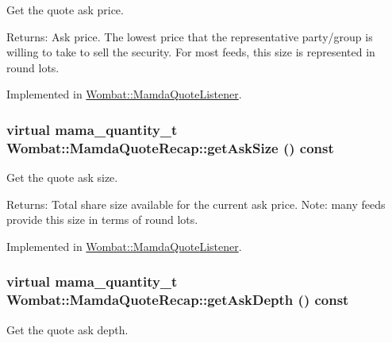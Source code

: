 Get the quote ask price. 

\begin{Desc}
\item[Returns:]Ask price. The lowest price that the representative party/group is willing to take to sell the security. For most feeds, this size is represented in round lots. \end{Desc}


Implemented in \hyperlink{classWombat_1_1MamdaQuoteListener_b4c49376d3d07db48065adc6d74da196}{Wombat::Mamda\-Quote\-Listener}.\hypertarget{classWombat_1_1MamdaQuoteRecap_1f30128c51192c26ccaf81bff1a5ef1b}{
\subsubsection[getAskSize]{\setlength{\rightskip}{0pt plus 5cm}virtual mama\_\-quantity\_\-t Wombat::Mamda\-Quote\-Recap::get\-Ask\-Size () const}}
\label{classWombat_1_1MamdaQuoteRecap_1f30128c51192c26ccaf81bff1a5ef1b}


Get the quote ask size. 

\begin{Desc}
\item[Returns:]Total share size available for the current ask price. Note: many feeds provide this size in terms of round lots. \end{Desc}


Implemented in \hyperlink{classWombat_1_1MamdaQuoteListener_4808439461507148c55e678a3dffbb5d}{Wombat::Mamda\-Quote\-Listener}.\hypertarget{classWombat_1_1MamdaQuoteRecap_fa0c912ad4721709726ceca9d7923fd2}{
\subsubsection[getAskDepth]{\setlength{\rightskip}{0pt plus 5cm}virtual mama\_\-quantity\_\-t Wombat::Mamda\-Quote\-Recap::get\-Ask\-Depth () const}}
\label{classWombat_1_1MamdaQuoteRecap_fa0c912ad4721709726ceca9d7923fd2}


Get the quote ask depth. 

